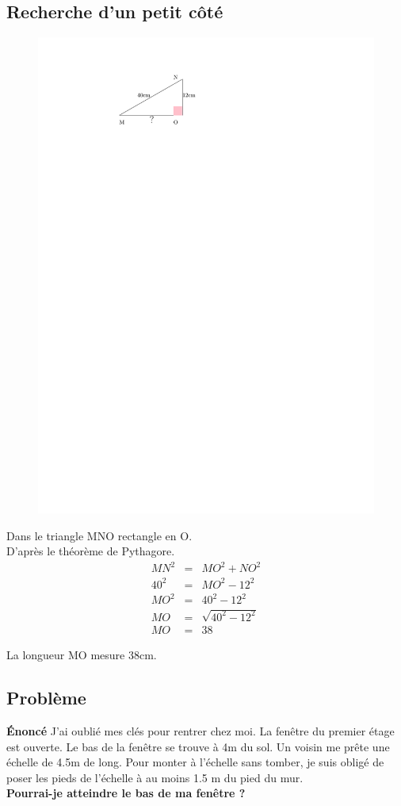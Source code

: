 \documentclass[12pt]{article}
\begin{document}
\begin{multicols}{2}
	\subsection*{Recherche d'un petit côté}

	\begin{figure}[H]
		\centering
		\includegraphics[width=0.5\linewidth]{4x1-pythagore/sources/re-c.pdf}
	\end{figure}

	Dans le triangle MNO rectangle en O.\\
	D'après le théorème de Pythagore.
	\begin{eqnarray*}
		MN^2 &=& MO^2 + NO^2 \\
		40^2 &=& MO^2 - 12^2 \\
		MO^2 &=& 40^2 - 12^2 \\
		MO   &=& \sqrt{40^2 - 12^2} \\
		MO   &=& 38
	\end{eqnarray*}

	La longueur MO mesure 38cm.

\end{multicols}
\subsection*{Problème}

\textbf{Énoncé} J'ai oublié mes clés pour rentrer chez moi. La fenêtre du premier étage est ouverte.
Le bas de la fenêtre se trouve à 4m du sol. Un voisin me prête une échelle de 4.5m de long.
Pour monter à l'échelle sans tomber, je suis obligé de poser les pieds de l'échelle à au moins 1.5 m du pied du mur.\\
\textbf{Pourrai-je atteindre le bas de ma fenêtre ?}
\end{document}
